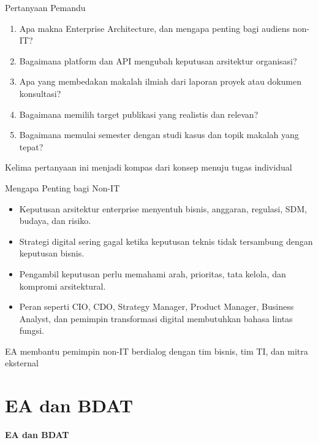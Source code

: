 \documentclass[aspectratio=169, table]{beamer}
\newcommand{\sectionframe}[1]{%
  \begin{frame}{\hfill}
    \centering
    \Huge{\textbf{#1}}
  \end{frame}
}
\newcommand{\takeaway}[1]{%
  \vspace{4pt}
  {\footnotesize #1}
}
\begin{document}
\begin{frame}{Pertanyaan Pemandu}
  \vspace{10pt}
  \begin{enumerate}
    \item Apa makna Enterprise Architecture, dan mengapa penting bagi audiens non-IT?
    \item Bagaimana platform dan API mengubah keputusan arsitektur organisasi?
    \item Apa yang membedakan makalah ilmiah dari laporan proyek atau dokumen konsultasi?
    \item Bagaimana memilih target publikasi yang realistis dan relevan?
    \item Bagaimana memulai semester dengan studi kasus dan topik makalah yang tepat?
  \end{enumerate}

  \takeaway{Kelima pertanyaan ini menjadi kompas dari konsep menuju tugas individual}
\end{frame}

\begin{frame}{Mengapa Penting bagi Non-IT}
  \vspace{10pt}
  \begin{itemize}
    \item Keputusan arsitektur enterprise menyentuh bisnis, anggaran, regulasi, SDM, budaya, dan risiko.
    \item Strategi digital sering gagal ketika keputusan teknis tidak tersambung dengan keputusan bisnis.
    \item Pengambil keputusan perlu memahami arah, prioritas, tata kelola, dan kompromi arsitektural.
    \item Peran seperti CIO, CDO, Strategy Manager, Product Manager, Business Analyst, dan pemimpin transformasi digital membutuhkan bahasa lintas fungsi.
  \end{itemize}

  \takeaway{EA membantu pemimpin non-IT berdialog dengan tim bisnis, tim TI, dan mitra eksternal}
\end{frame}

\section{EA dan BDAT}
\sectionframe{EA dan BDAT}
\end{document}
